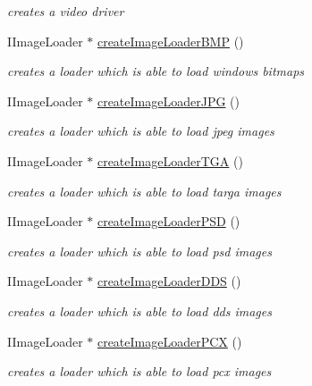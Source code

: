 \begin{DoxyCompactItemize}
\begin{DoxyCompactList}\small\item\em creates a video driver \end{DoxyCompactList}\item 
I\-Image\-Loader $\ast$ \hyperlink{namespaceirr_1_1video_a07ee2f71926f10048b8e1010c6939872}{create\-Image\-Loader\-B\-M\-P} ()
\begin{DoxyCompactList}\small\item\em creates a loader which is able to load windows bitmaps \end{DoxyCompactList}\item 
I\-Image\-Loader $\ast$ \hyperlink{namespaceirr_1_1video_aaa4aeeab57c128bd74779afaae3d6f40}{create\-Image\-Loader\-J\-P\-G} ()
\begin{DoxyCompactList}\small\item\em creates a loader which is able to load jpeg images \end{DoxyCompactList}\item 
I\-Image\-Loader $\ast$ \hyperlink{namespaceirr_1_1video_ac18965ce833fd4c02b812c0c74910574}{create\-Image\-Loader\-T\-G\-A} ()
\begin{DoxyCompactList}\small\item\em creates a loader which is able to load targa images \end{DoxyCompactList}\item 
I\-Image\-Loader $\ast$ \hyperlink{namespaceirr_1_1video_a097559bb91be988d4b80dacd504da048}{create\-Image\-Loader\-P\-S\-D} ()
\begin{DoxyCompactList}\small\item\em creates a loader which is able to load psd images \end{DoxyCompactList}\item 
I\-Image\-Loader $\ast$ \hyperlink{namespaceirr_1_1video_a37405f32c500e6180818d081fe7755d7}{create\-Image\-Loader\-D\-D\-S} ()
\begin{DoxyCompactList}\small\item\em creates a loader which is able to load dds images \end{DoxyCompactList}\item 
I\-Image\-Loader $\ast$ \hyperlink{namespaceirr_1_1video_a1707e47e944b7a60fefcb65753fd2c7f}{create\-Image\-Loader\-P\-C\-X} ()
\begin{DoxyCompactList}\small\item\em creates a loader which is able to load pcx images \end{DoxyCompactList}\item 

\end{DoxyCompactItemize}
